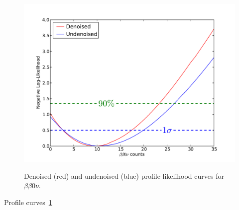 \begin{figure}
\begin{center}
\includegraphics[keepaspectratio=true,width=\textwidth]{DenoisedVsUndenoised_bb0nProfiles.pdf}
\end{center}
\renewcommand{\baselinestretch}{1}
\small\normalsize
\begin{quote}
\caption{Denoised (red) and undenoised (blue) profile likelihood curves for $\beta\beta 0\nu$.}
\label{fig:DenoisedComparison_Profiles}
\end{quote}
\end{figure}
\renewcommand{\baselinestretch}{2}
\small\normalsize
Profile curves~\ref{fig:DenoisedComparison_Profiles}

